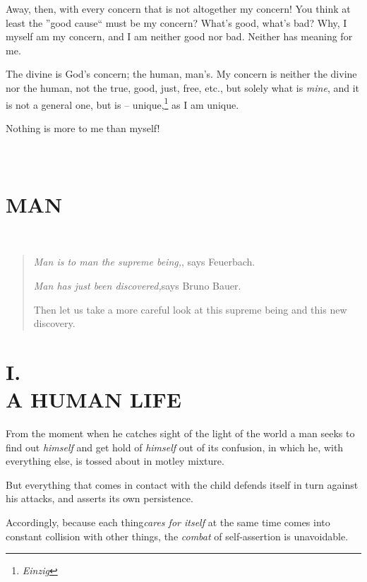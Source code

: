 \documentclass[12pt,a4paper]{book}
\begin{document}
Away, then, with every concern that is not altogether my concern! You think at 
least the ''good cause`` must be my concern? What's good, what's bad? Why, I 
myself am my concern, and I am neither good nor bad. Neither has meaning for 
me.

The divine is God's concern; the human, man's. My concern is neither the 
divine nor the human, not the true, good, just, free, etc., but solely what is 
\textit{mine}, and it is not a general one, but is -- 
unique,\footnote{\textit{Einzig}} as I am unique.

Nothing is more to me than myself!


\chapter[Part First: Man]{\\
MAN}

\newpage{}

~

\vspace{200pt}

\begin{quote}

\textit{Man is to man the supreme being,}, says Feuerbach.

\textit{Man has just been discovered,}says Bruno Bauer.

Then let us take a more careful look at this supreme being and this new 
discovery.

\end{quote}

\medskip{}

\chapter[I. A Human Life]{\centering I.\\
A HUMAN LIFE}

From the moment when he catches sight of the light of the world a man seeks to 
find out \textit{himself} and get hold of \textit{himself} out of its 
confusion, in which he, with everything else, is tossed about in motley 
mixture.

But everything that comes in contact with the child defends itself in turn 
against his attacks, and asserts its own persistence.

Accordingly, because each thing\textit{cares for itself} at the same time 
comes into constant collision with other things, the \textit{combat} of 
self-assertion is unavoidable.
\end{document}
